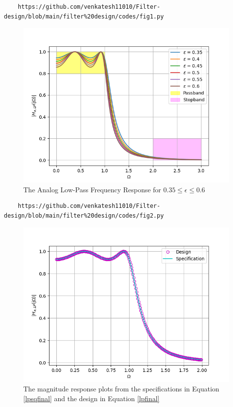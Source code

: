 \documentclass{article}
\begin{document}
\begin{lstlisting}
	https://github.com/venkatesh11010/Filter-design/blob/main/filter%20design/codes/fig1.py
\end{lstlisting}
\begin{figure}[H]
\includegraphics[width = \columnwidth]{figs/epsilon.png}
\caption{The Analog Low-Pass Frequency Response for $0.35 \leq \epsilon \leq 0.6$}
\label{fig2}
\end{figure}
\begin{lstlisting}
	https://github.com/venkatesh11010/Filter-design/blob/main/filter%20design/codes/fig2.py
\end{lstlisting}
\begin{figure}[H]
\includegraphics[width = \columnwidth]{figs/fig2.png}
\caption{The magnitude response plots from the specifications in Equation \ref{lpsqfinal} and the design in Equation \ref{lpfinal}}
\label{fig3}
\end{figure}
\end{document}
